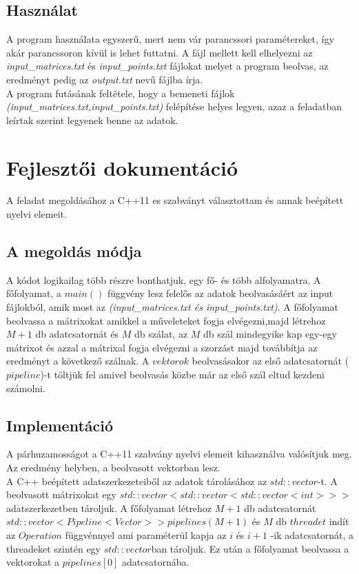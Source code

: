 \documentclass{article}
\begin{document}
\subsection{Használat}
A program használata egyszerű, mert nem vár parancssori paramétereket, így akár parancssoron kívül is lehet futtatni. A fájl mellett kell elhelyezni az \textit{input\_matrices.txt} és \textit{input\_points.txt} fájlokat melyet a program beolvas, az eredményt pedig az \textit{output.txt} nevű fájlba írja.\\
A program futásának feltétele, hogy a bemeneti fájlok \textit{(input\_matrices.txt,input\_points.txt)} felépítése helyes legyen, azaz a feladatban leírtak szerint legyenek benne az adatok.
\newpage

\section{Fejlesztői dokumentáció}
\begin{itshape}
A feladat megoldásához a C++11 es szabványt választottam és annak beépített nyelvi elemeit. \\
\end{itshape}

\subsection{A megoldás módja}
A kódot logikailag több részre bonthatjuk, egy fő- és több alfolyamatra. A főfolyamat, a $main()$ függvény lesz felelős az adatok beolvasásáért az input fájlokból, amik most az \textit{(input\_matrices.txt és input\_points.txt)}. A főfolyamat beolvassa a mátrixokat amikkel a műveleteket fogja elvégezni,majd létrehoz $M+1$ db adatcsatornát és $M$ db szálat, az $M$ db szál mindegyike kap egy-egy mátrixot és azzal a mátrixal fogja elvégezni a szorzást majd továbbítja az eredményt a következő szálnak. A $vektorok$ beolvasásakor az első adatcsatornát ($pipeline$)-t töltjük fel amivel beolvasás közbe már az első szál eltud kezdeni számolni.
\subsection{Implementáció}
A párhuzamosságot a C++11 szabvány nyelvi elemeit kihasználva valósítjuk meg. Az eredmény helyben, a beolvasott vektorban lesz.\\

A C++ beépített adatszerkezeteiből  az adatok tárolásához az $std::vector$-t. A beolvasott mátrixokat egy $std::vector<std::vector<std::vector<int>>>$ adatszerkezetben tároljuk. A főfolyamat létrehoz $M+1$ db adatcsatornát $std::vector<Pipeline<Vector>> pipelines(M+1)$ és $M$ db $threadet$ indít az $Operation$ függvénnyel ami paraméterül kapja az $i$ és $i+1$ -ik adatcsatornát, a threadeket szintén egy $std::vector$ban tároljuk. Ez után a főfolyamat beolvassa a vektorokat a $pipelines[0]$ adatcsatornába.
\end{document}
